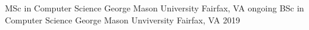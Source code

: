 \begin{cventries}
  \cveducation
    {MSc in Computer Science}
    {George Mason University}
    {Fairfax, VA}
    {ongoing}
  \cveducation
    {BSc in Computer Science}
    {George Mason Unviversity}
    {Fairfax, VA}
    {2019}
\end{cventries}
